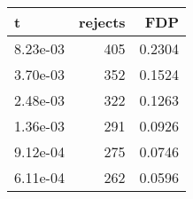\begin{TRUE}[ht]
\centering
\begin{tabular}{lrr}
  \hline
t & rejects & FDP \\ 
  \hline
8.23e-03 & 405 & 0.2304 \\ 
  3.70e-03 & 352 & 0.1524 \\ 
  2.48e-03 & 322 & 0.1263 \\ 
  1.36e-03 & 291 & 0.0926 \\ 
  9.12e-04 & 275 & 0.0746 \\ 
  6.11e-04 & 262 & 0.0596 \\ 
   \hline
\end{tabular}
\end{TRUE}

